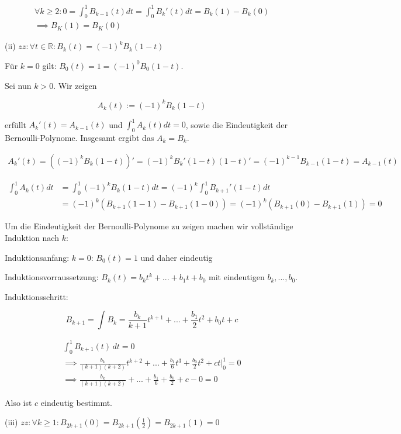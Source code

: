 \documentclass[]{article}
\begin{document}
\begin{align*}
\forall k \geq 2: 0 = \int_{0}^{1} B_{k-1}(t) dt = \int_{0}^{1} B_{k}'(t) dt = 	B_k(1) - B_k(0) \\
\implies B_K(1) = B_K(0)
\end{align*}

\noindent
(ii) $zz: \forall t \in \mathbb{R}: B_k(t) = (-1)^k B_k(1-t)$

Für $k=0$ gilt: $B_0(t) = 1 = (-1)^0 B_0(1-t)$.

Sei nun $k>0$. Wir zeigen

\[
A_k(t):=(-1)^k B_k(1-t)
\]

erfüllt $A_k'(t)=A_{k-1}(t)$ und $\int_{0}^{1}A_k(t)dt = 0$, sowie die Eindeutigkeit der Bernoulli-Polynome. Insgesamt ergibt das $A_k=B_k$.

\begin{align*}
	A_k'(t)=((-1)^k B_k(1-t))' = (-1)^k B_k'(1-t) (1-t)' = (-1)^{k-1} B_{k-1}(1-t) = A_{k-1}(t)
\end{align*}

\begin{align*}
	\int_{0}^{1}A_k(t)dt &= \int_{0}^{1}(-1)^kB_k(1-t)dt = (-1)^k \int_{0}^{1}B_{k+1}'(1-t)dt \\
	&= (-1)^k (B_{k+1}(1-1) - B_{k+1}(1-0)) = (-1)^k (B_{k+1}(0) - B_{k+1}(1)) = 0
\end{align*}

Um die Eindeutigkeit der Bernoulli-Polynome zu zeigen machen wir vollständige Induktion nach $k$:

Induktionsanfang: $k=0$: $B_0(t)=1$ und daher eindeutig

Induktionsvorraussetzung: $B_k(t)=b_k t^k + ... + b_1 t + b_0$ mit eindeutigen $b_k, ..., b_0$. 

Induktionsschritt:

\[
B_{k+1} = \int B_k = \frac{b_k}{k+1}t^{k+1} + ... + \frac{b_1}{2}t^2+b_0t+c
\]

\begin{align*}
	\int_{0}^{1}B_{k+1}(t) \,dt = 0 \\
	\implies \frac{b_k}{(k+1)(k+2)}t^{k+2} + ... + \frac{b_1}{6}t^3 + \frac{b_0}{2}t^2 + ct \Big|_{0}^{1} = 0 \\
	\implies \frac{b_k}{(k+1)(k+2)} + ... + \frac{b_1}{6} + \frac{b_0}{2} + c - 0 = 0
\end{align*}

Also ist $c$ eindeutig bestimmt.

(iii) $zz: \forall k \geq 1: B_{2k+1}(0) = B_{2k+1}(\frac{1}{2})=B_{2k+1}(1)=0$
\end{document}
